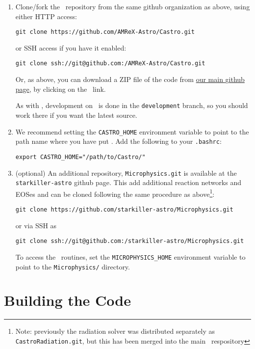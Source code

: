 \begin{enumerate}
\item Clone/fork the \castro\ repository from the same {\sf
  github} organization as above, using either HTTP access:
\begin{verbatim}
git clone https://github.com/AMReX-Astro/Castro.git
\end{verbatim}
or SSH access if you have it enabled:
\begin{verbatim}
git clone ssh://git@github.com:/AMReX-Astro/Castro.git
\end{verbatim}
Or, as above, you can download a ZIP file of the code from
\href{https://github.com/AMReX-Astro}{our main {\sf github} page},
by clicking on the \castro\ link.

As with \amrex, development on \castro\ is done in the
{\tt development} branch, so you should work there if you want
the latest source.

\item We recommend setting the {\tt CASTRO\_HOME} environment
  variable to point to the path name where you have put \castro.
  Add the following to your {\tt .bashrc}:
\begin{verbatim}
export CASTRO_HOME="/path/to/Castro/"
\end{verbatim}


\item (optional) An additional repository, {\tt Microphysics.git} is
  available at the {\tt starkiller-astro} github page.  This add
  additional reaction networks and EOSes and can be cloned following
  the same procedure as above\footnote{Note: previously the radiation
    solver was distributed separately as {\tt CastroRadiation.git},
    but this has been merged into the main \castro\ respository}:
\begin{verbatim}
git clone https://github.com/starkiller-astro/Microphysics.git
\end{verbatim}
or via SSH as
\begin{verbatim}
git clone ssh://git@github.com:/starkiller-astro/Microphysics.git
\end{verbatim}

To access the \microphysics\ routines, set the {\tt MICROPHYSICS\_HOME}
environment variable to point to the {\tt Microphysics/} directory.

\end{enumerate}


\section{Building the Code}

